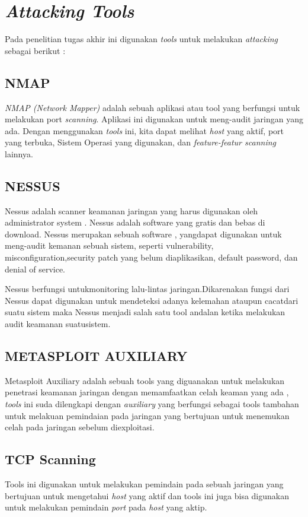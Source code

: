 \section{\emph{Attacking Tools}}
Pada penelitian tugas akhir ini digunakan \emph{tools} untuk  melakukan \emph{attacking} sebagai berikut :


\subsection{NMAP}
\emph{NMAP (Network Mapper)} adalah sebuah aplikasi atau tool yang berfungsi untuk melakukan port \emph{scanning}. Aplikasi ini digunakan untuk meng-audit jaringan yang ada. Dengan menggunakan \emph{tools} ini, kita dapat melihat \emph{host} yang aktif, port yang terbuka, Sistem Operasi yang digunakan, dan \emph{feature-featur scanning} lainnya.

\subsection{NESSUS}
 
Nessus adalah scanner keamanan jaringan yang harus digunakan oleh administrator system . Nessus adalah software yang gratis dan bebas di download. Nessus merupakan sebuah software , yangdapat digunakan untuk meng-audit kemanan sebuah sistem, seperti vulnerability, misconfiguration,security patch yang belum diaplikasikan, default password, dan denial of service.

Nessus berfungsi untukmonitoring lalu-lintas jaringan.Dikarenakan fungsi dari Nessus dapat digunakan untuk mendeteksi adanya kelemahan ataupun cacatdari suatu sistem maka Nessus menjadi salah satu tool andalan ketika melakukan audit keamanan suatusistem. 

\subsection{METASPLOIT AUXILIARY}
Metasploit Auxiliary adalah sebuah tools yang diguanakan untuk melakukan penetrasi keamanan jaringan dengan memamfaatkan celah keaman yang ada , \emph{tools} ini suda dilengkapi dengan \emph{auxiliary} yang berfungsi sebagai tools tambahan untuk melakuan pemindaian pada jaringan yang bertujuan untuk menemukan celah pada jaringan sebelum diexploitasi.

\subsection{TCP Scanning}
Tools ini digunakan untuk melakukan pemindain pada sebuah jaringan yang bertujuan untuk mengetahui \emph{host} yang aktif dan tools ini juga bisa digunakan untuk melakukan pemindain \emph{port} pada \emph{host} yang aktip.

